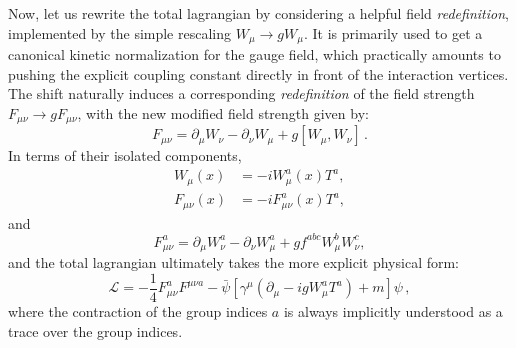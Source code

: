 Now, let us rewrite the total lagrangian by considering a helpful field \textit{redefinition}, implemented by the simple rescaling \(W_\mu \rightarrow g W_\mu\). It is primarily used to get a canonical kinetic normalization for the gauge field, which practically amounts to pushing the explicit coupling constant directly in front of the interaction vertices. The shift naturally induces a corresponding \textit{redefinition} of the field strength \(F_{\mu\nu} \rightarrow g F_{\mu\nu}\), with the new modified field strength given by:
\begin{equation} \label{eq:field_strength_rescaled}
    F_{\mu\nu} = \partial_\mu W_\nu - \partial_\nu W_\mu + g [W_\mu, W_\nu] \, .
\end{equation}
In terms of their isolated components,
\begin{equation} \label{eq:components_w_f}
    \begin{aligned}
        W_\mu(x)      & = -iW_\mu^a(x)T^a,      \\
        F_{\mu\nu}(x) & = -iF_{\mu\nu}^a(x)T^a,
    \end{aligned}
\end{equation}
and
\begin{equation} \label{eq:f_components_explicit}
    F_{\mu\nu}^a = \partial_\mu W_\nu^a - \partial_\nu W_\mu^a + g f^{abc}W_\mu^b W_\nu^c,
\end{equation}
and the total lagrangian ultimately takes the more explicit physical form:
\begin{equation} \label{eq:lagrangian_explicit}
    \boxed{\mathcal{L} = -\frac{1}{4}F_{\mu\nu}^a F^{\mu\nu a} - \bar{\psi}[\gamma^\mu(\partial_\mu - ig W_\mu^a T^a) + m]\psi} \, ,
\end{equation}
where the contraction of the group indices \(a\) is always implicitly understood as a trace over the group indices.

